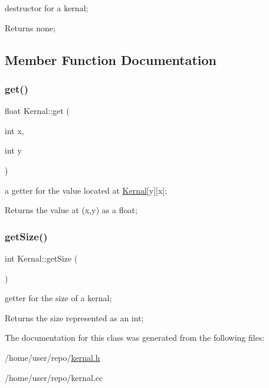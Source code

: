 destructor for a kernal; 

\begin{DoxyReturn}{Returns}
none; 
\end{DoxyReturn}


\subsection{Member Function Documentation}
\mbox{\label{classKernal_a4dfa813ba722fa66f40fb89443b23561}} 
\subsubsection{\texorpdfstring{get()}{get()}}
{\footnotesize\ttfamily float Kernal\+::get (\begin{DoxyParamCaption}\item[{int}]{x,  }\item[{int}]{y }\end{DoxyParamCaption})}



a getter for the value located at \hyperlink{classKernal}{Kernal}\mbox{[}y\mbox{]}\mbox{[}x\mbox{]}; 

\begin{DoxyReturn}{Returns}
the value at (x,y) as a float; 
\end{DoxyReturn}
\mbox{\label{classKernal_a0767772b0bf3f7eacb910fcd9ae1bfcc}} 
\subsubsection{\texorpdfstring{get\+Size()}{getSize()}}
{\footnotesize\ttfamily int Kernal\+::get\+Size (\begin{DoxyParamCaption}{ }\end{DoxyParamCaption})}



getter for the size of a kernal; 

\begin{DoxyReturn}{Returns}
the size represented as an int; 
\end{DoxyReturn}


The documentation for this class was generated from the following files\+:\begin{DoxyCompactItemize}
\item 
/home/user/repo/\hyperlink{kernal_8h}{kernal.\+h}\item 
/home/user/repo/kernal.\+cc\end{DoxyCompactItemize}
